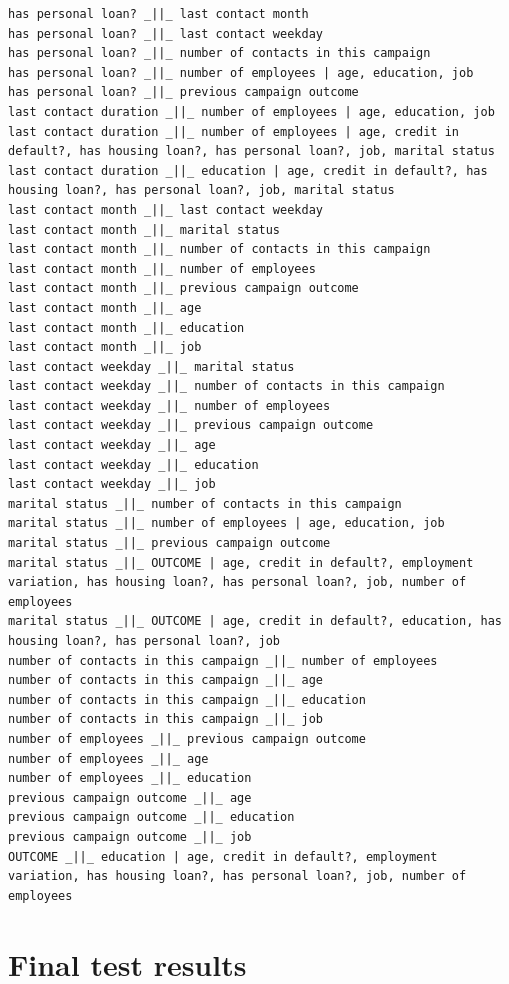 \documentclass[11pt,]{article}
\begin{document}
{\begin{verbatim}
has personal loan? _||_ last contact month
has personal loan? _||_ last contact weekday
has personal loan? _||_ number of contacts in this campaign
has personal loan? _||_ number of employees | age, education, job
has personal loan? _||_ previous campaign outcome
last contact duration _||_ number of employees | age, education, job
last contact duration _||_ number of employees | age, credit in default?, has housing loan?, has personal loan?, job, marital status
last contact duration _||_ education | age, credit in default?, has housing loan?, has personal loan?, job, marital status
last contact month _||_ last contact weekday
last contact month _||_ marital status
last contact month _||_ number of contacts in this campaign
last contact month _||_ number of employees
last contact month _||_ previous campaign outcome
last contact month _||_ age
last contact month _||_ education
last contact month _||_ job
last contact weekday _||_ marital status
last contact weekday _||_ number of contacts in this campaign
last contact weekday _||_ number of employees
last contact weekday _||_ previous campaign outcome
last contact weekday _||_ age
last contact weekday _||_ education
last contact weekday _||_ job
marital status _||_ number of contacts in this campaign
marital status _||_ number of employees | age, education, job
marital status _||_ previous campaign outcome
marital status _||_ OUTCOME | age, credit in default?, employment variation, has housing loan?, has personal loan?, job, number of employees
marital status _||_ OUTCOME | age, credit in default?, education, has housing loan?, has personal loan?, job
number of contacts in this campaign _||_ number of employees
number of contacts in this campaign _||_ age
number of contacts in this campaign _||_ education
number of contacts in this campaign _||_ job
number of employees _||_ previous campaign outcome
number of employees _||_ age
number of employees _||_ education
previous campaign outcome _||_ age
previous campaign outcome _||_ education
previous campaign outcome _||_ job
OUTCOME _||_ education | age, credit in default?, employment variation, has housing loan?, has personal loan?, job, number of employees
\end{verbatim}}

\hypertarget{final-test-results}{%
\section{Final test results}\label{final-test-results}}
\end{document}
